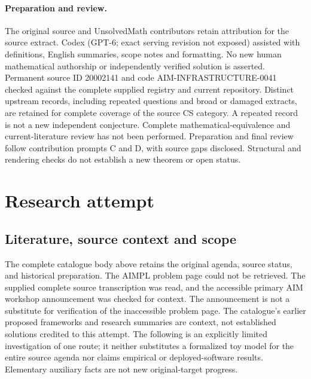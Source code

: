 \documentclass[11pt]{article}
\begin{document}
\paragraph{Preparation and review.}
The original source and UnsolvedMath contributors retain attribution for the source extract. Codex (GPT-6; exact serving revision not exposed) assisted with definitions, English summaries, scope notes and formatting. No new human mathematical authorship or independently verified solution is asserted. Permanent source ID 20002141 and code AIM-INFRASTRUCTURE-0041 checked against the complete supplied registry and current repository. Distinct upstream records, including repeated questions and broad or damaged extracts, are retained for complete coverage of the source CS category. A repeated record is not a new independent conjecture. Complete mathematical-equivalence and current-literature review has not been performed. Preparation and final review follow contribution prompts C and D, with source gaps disclosed. Structural and rendering checks do not establish a new theorem or open status.
\label{end:20002141}

\section{Research attempt}
\subsection{Literature, source context and scope}
The complete catalogue body above retains the original agenda, source status, and historical preparation. The AIMPL problem page could not be retrieved. The supplied complete source transcription was read, and the accessible primary AIM workshop announcement was checked for context. The announcement is not a substitute for verification of the inaccessible problem page. The catalogue's earlier proposed frameworks and research summaries are context, not established solutions credited to this attempt. The following is an explicitly limited investigation of one route; it neither substitutes a formalized toy model for the entire source agenda nor claims empirical or deployed-software results. Elementary auxiliary facts are not new original-target progress.
\end{document}
